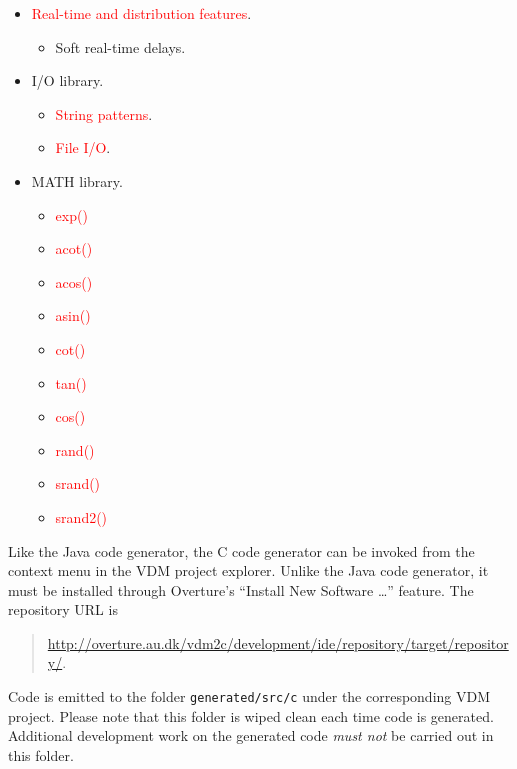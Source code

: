 \begin{itemize}
%
\item  \textcolor{red}{Real-time and distribution features}.
\begin{itemize}
\item  Soft real-time delays.
\end{itemize}
%
\item  I/O library.
\begin{itemize}
\item  \textcolor{red}{String patterns}.
\item  \textcolor{red}{File I/O}.
\end{itemize}
%
\item MATH library.
\begin{itemize}
\item  \textcolor{red}{exp()}
\item  \textcolor{red}{acot()}
\item  \textcolor{red}{acos()}
\item  \textcolor{red}{asin()}
\item  \textcolor{red}{cot()}
\item  \textcolor{red}{tan()}
\item  \textcolor{red}{cos()}
\item  \textcolor{red}{rand()}
\item  \textcolor{red}{srand()}
\item  \textcolor{red}{srand2()}
\end{itemize}
%
\end{itemize}

Like the Java code generator, the C code generator can be invoked from the context menu in the VDM project explorer.
%
Unlike the Java code generator, it must be installed through Overture's ``Install New Software \dots'' feature.
%
The repository URL is
%
%
%
\begin{quote}
\url{http://overture.au.dk/vdm2c/development/ide/repository/target/repository/}.
\end{quote}
%
Code is emitted to the folder \texttt{generated/src/c} under the corresponding VDM project.
%
Please note that this folder is wiped clean each time code is generated.
%
Additional development work on the generated code \emph{must not} be carried out in this folder.
